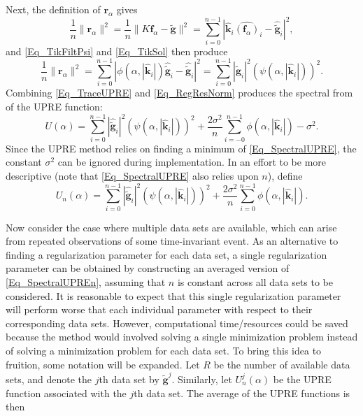 \documentclass[12pt]{article}
\newcommand{\gnoise}{\widetilde{\mathbf{g}}}
\newcommand{\kdis}{\mathbf{k}}
\newcommand{\kmat}{K}	%
\newcommand{\fdis}{\mathbf{f}}
\newcommand{\regparam}{\alpha}
\newcommand{\freg}{\fdis_{\regparam}}	%
\newcommand{\filt}{\phi}
\newcommand{\mfilt}{\psi}
\newcommand{\noiseSD}{\sigma}	%
\newcommand{\regres}{\mathbf{r}_{\regparam}}	%
\newcommand{\U}{U}	%
\begin{document}
Next, the definition of $\regres$ gives
\[\frac{1}{n}\|\regres\|^2 = \frac{1}{n}\|\kmat\freg - \gnoise\|^2 = \sum_{i = 0}^{n-1} |\widehat{\kdis}_i\widehat{(\freg)}_i - \widehat{\gnoise}_i|^2,\]
and \eqref{Eq_TikFiltPsi} and \eqref{Eq_TikSol} then produce
\begin{equation}
\frac{1}{n}\|\regres\|^2 = \sum_{i = 0}^{n-1} |\filt(\regparam,|\widehat{\kdis}_i|)\widehat{\gnoise}_i - \widehat{\gnoise}_i|^2 = \sum_{i = 0}^{n-1} |\widehat{\gnoise}_i|^2(\mfilt(\regparam,|\widehat{\kdis}_i|))^2.
\label{Eq_RegResNorm}
\end{equation}
Combining \eqref{Eq_TraceUPRE} and \eqref{Eq_RegResNorm} produces the spectral from of the UPRE function:
\begin{equation}
\U(\regparam) = \sum_{i = 0}^{n-1} |\widehat{\gnoise}_i|^2(\mfilt(\regparam,|\widehat{\kdis}_i|))^2 + \frac{2\noiseSD^2}{n}\sum_{i = -0}^{n-1} \filt(\regparam,|\widehat{\kdis}_i|) - \noiseSD^2.
\label{Eq_SpectralUPRE}
\end{equation} 
Since the UPRE method relies on finding a minimum of \eqref{Eq_SpectralUPRE}, the constant $\noiseSD^2$ can be ignored during implementation. In an effort to be more descriptive (note that \eqref{Eq_SpectralUPRE} also relies upon $n$), define
\begin{equation}
\U_n(\regparam) = \sum_{i = 0}^{n-1} |\widehat{\gnoise}_i|^2(\mfilt(\regparam,|\widehat{\kdis}_i|))^2 + \frac{2\noiseSD^2}{n}\sum_{i = 0}^{n-1} \filt(\regparam,|\widehat{\kdis}_i|).
\label{Eq_SpectralUPREn}
\end{equation} \par 
Now consider the case where multiple data sets are available, which can arise from repeated observations of some time-invariant event. As an alternative to finding a regularization parameter for each data set, a single regularization parameter can be obtained by constructing an averaged version of \eqref{Eq_SpectralUPREn}, assuming that $n$ is constant across all data sets to be considered. It is reasonable to expect that this single regularization parameter will perform worse that each individual parameter with respect to their corresponding data sets. However, computational time/resources could be saved because the method would involved solving a single minimization problem instead of solving a minimization problem for each data set. To bring this idea to fruition, some notation will be expanded. Let $R$ be the number of available data sets, and denote the $j$th data set by $\gnoise^j$. Similarly, let $\U_n^j(\regparam)$ be the UPRE function associated with the $j$th data set.  The average of the UPRE functions is then 
\end{document}
